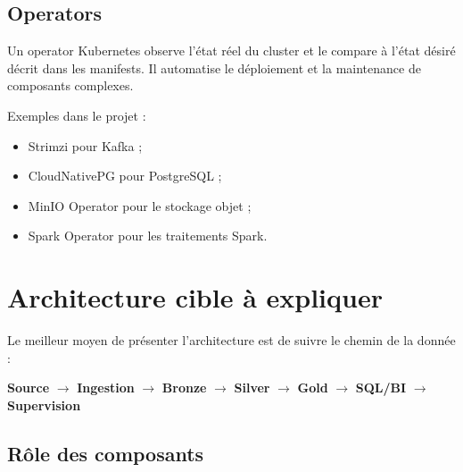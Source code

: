 \documentclass[11pt,a4paper]{article}
\newcommand{\important}[1]{%
  \vspace{0.25cm}
  \noindent
  \colorbox{softblue}{%
    \parbox{\dimexpr\textwidth-2\fboxsep\relax}{#1}%
  }
  \vspace{0.2cm}
}
\begin{document}
\subsection{Operators}

Un operator Kubernetes observe l'état réel du cluster et le compare à l'état désiré décrit dans les manifests. Il automatise le déploiement et la maintenance de composants complexes.

Exemples dans le projet :
\begin{itemize}
  \item Strimzi pour Kafka ;
  \item CloudNativePG pour PostgreSQL ;
  \item MinIO Operator pour le stockage objet ;
  \item Spark Operator pour les traitements Spark.
\end{itemize}

\section{Architecture cible à expliquer}

Le meilleur moyen de présenter l'architecture est de suivre le chemin de la donnée :

\important{
\textbf{Source} $\rightarrow$ \textbf{Ingestion} $\rightarrow$ \textbf{Bronze} $\rightarrow$ \textbf{Silver} $\rightarrow$ \textbf{Gold} $\rightarrow$ \textbf{SQL/BI} $\rightarrow$ \textbf{Supervision}
}

\subsection{Rôle des composants}
\end{document}
